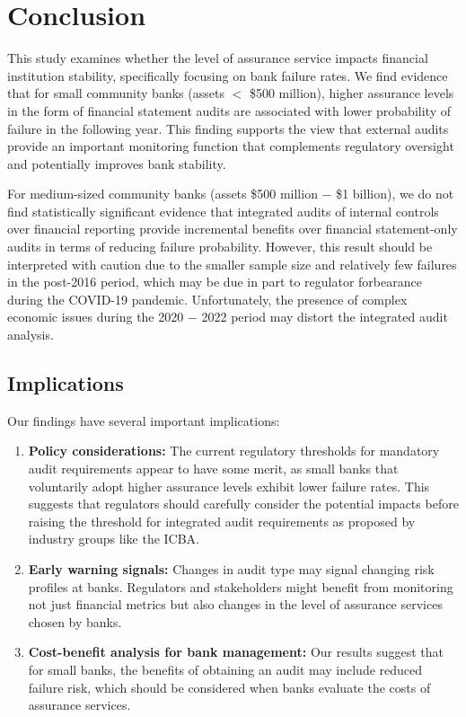 \documentclass[12pt]{article}
\begin{document}
\section{Conclusion}

This study examines whether the level of assurance service impacts financial institution stability, specifically focusing on bank failure rates. We find evidence that for small community banks (assets $<$ \$500 million), higher assurance levels in the form of financial statement audits are associated with lower probability of failure in the following year. This finding supports the view that external audits provide an important monitoring function that complements regulatory oversight and potentially improves bank stability.

For medium-sized community banks (assets \$500 million $-$ \$1 billion), we do not find statistically significant evidence that integrated audits of internal controls over financial reporting provide incremental benefits over financial statement-only audits in terms of reducing failure probability. However, this result should be interpreted with caution due to the smaller sample size and relatively few failures in the post-2016 period, which may be due in part to regulator forbearance during the COVID-19 pandemic. Unfortunately, the presence of complex economic issues during the 2020 $-$ 2022 period may distort the integrated audit analysis.

\subsection{Implications}

Our findings have several important implications:

\begin{enumerate}
    \item \textbf{Policy considerations:} The current regulatory thresholds for mandatory audit requirements appear to have some merit, as small banks that voluntarily adopt higher assurance levels exhibit lower failure rates. This suggests that regulators should carefully consider the potential impacts before raising the threshold for integrated audit requirements as proposed by industry groups like the ICBA.
    
    \item \textbf{Early warning signals:} Changes in audit type may signal changing risk profiles at banks. Regulators and stakeholders might benefit from monitoring not just financial metrics but also changes in the level of assurance services chosen by banks.
    
    \item \textbf{Cost-benefit analysis for bank management:} Our results suggest that for small banks, the benefits of obtaining an audit may include reduced failure risk, which should be considered when banks evaluate the costs of assurance services.
\end{enumerate}
\end{document}
